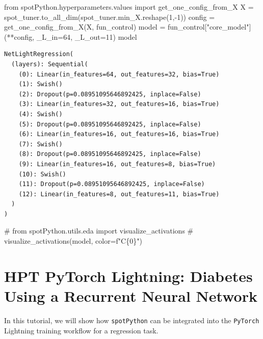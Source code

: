 \documentclass[
  letterpaper,
  DIV=11,
  numbers=noendperiod]{scrreprt}
\newenvironment{Shaded}{\begin{snugshade}}{\end{snugshade}}
\newcommand{\CommentTok}[1]{\textcolor[rgb]{0.37,0.37,0.37}{#1}}
\newcommand{\DecValTok}[1]{\textcolor[rgb]{0.68,0.00,0.00}{#1}}
\newcommand{\ImportTok}[1]{\textcolor[rgb]{0.00,0.46,0.62}{#1}}
\newcommand{\NormalTok}[1]{\textcolor[rgb]{0.00,0.23,0.31}{#1}}
\newcommand{\OperatorTok}[1]{\textcolor[rgb]{0.37,0.37,0.37}{#1}}
\newcommand{\StringTok}[1]{\textcolor[rgb]{0.13,0.47,0.30}{#1}}
\begin{document}
\begin{Shaded}
\begin{Highlighting}[]
\ImportTok{from}\NormalTok{ spotPython.hyperparameters.values }\ImportTok{import}\NormalTok{ get\_one\_config\_from\_X}
\NormalTok{X }\OperatorTok{=}\NormalTok{ spot\_tuner.to\_all\_dim(spot\_tuner.min\_X.reshape(}\DecValTok{1}\NormalTok{,}\OperatorTok{{-}}\DecValTok{1}\NormalTok{))}
\NormalTok{config }\OperatorTok{=}\NormalTok{ get\_one\_config\_from\_X(X, fun\_control)}
\NormalTok{model }\OperatorTok{=}\NormalTok{ fun\_control[}\StringTok{"core\_model"}\NormalTok{](}\OperatorTok{**}\NormalTok{config, \_L\_in}\OperatorTok{=}\DecValTok{64}\NormalTok{, \_L\_out}\OperatorTok{=}\DecValTok{11}\NormalTok{)}
\NormalTok{model}
\end{Highlighting}
\end{Shaded}

\begin{verbatim}
NetLightRegression(
  (layers): Sequential(
    (0): Linear(in_features=64, out_features=32, bias=True)
    (1): Swish()
    (2): Dropout(p=0.08951095646892425, inplace=False)
    (3): Linear(in_features=32, out_features=16, bias=True)
    (4): Swish()
    (5): Dropout(p=0.08951095646892425, inplace=False)
    (6): Linear(in_features=16, out_features=16, bias=True)
    (7): Swish()
    (8): Dropout(p=0.08951095646892425, inplace=False)
    (9): Linear(in_features=16, out_features=8, bias=True)
    (10): Swish()
    (11): Dropout(p=0.08951095646892425, inplace=False)
    (12): Linear(in_features=8, out_features=11, bias=True)
  )
)
\end{verbatim}

\begin{Shaded}
\begin{Highlighting}[]
\CommentTok{\# from spotPython.utils.eda import visualize\_activations}
\CommentTok{\# visualize\_activations(model, color=f"C\{0\}")}
\end{Highlighting}
\end{Shaded}

\chapter{HPT PyTorch Lightning: Diabetes Using a Recurrent Neural
Network}\label{hpt-pytorch-lightning-diabetes-using-a-recurrent-neural-network}

In this tutorial, we will show how \texttt{spotPython} can be integrated
into the \texttt{PyTorch} Lightning training workflow for a regression
task.
\end{document}
